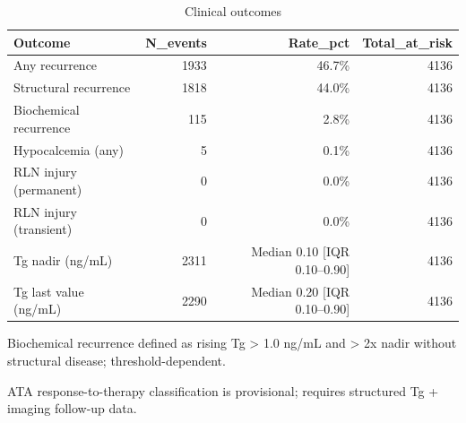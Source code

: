 \begin{table}[htbp]
\centering
\caption{Clinical outcomes}
\label{tab:outcomes}
\begin{tabular}{lrrr}
\toprule
Outcome & N\_events & Rate\_pct & Total\_at\_risk \\
\midrule
Any recurrence & 1933 & 46.7\% & 4136 \\
Structural recurrence & 1818 & 44.0\% & 4136 \\
Biochemical recurrence & 115 & 2.8\% & 4136 \\
Hypocalcemia (any) & 5 & 0.1\% & 4136 \\
RLN injury (permanent) & 0 & 0.0\% & 4136 \\
RLN injury (transient) & 0 & 0.0\% & 4136 \\
Tg nadir (ng/mL) & 2311 & Median 0.10 [IQR 0.10--0.90] & 4136 \\
Tg last value (ng/mL) & 2290 & Median 0.20 [IQR 0.10--0.90] & 4136 \\
\bottomrule
\end{tabular}
\begin{tablenotes}\footnotesize
\item[1] Biochemical recurrence defined as rising Tg > 1.0 ng/mL and > 2x nadir without structural disease; threshold-dependent.
\item[2] ATA response-to-therapy classification is provisional; requires structured Tg + imaging follow-up data.
\end{tablenotes}
\end{table}